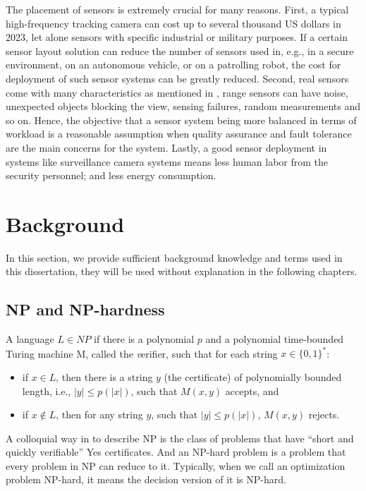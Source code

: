 The placement of sensors is extremely crucial for many reasons.
First, a typical high-frequency tracking camera can cost up to several thousand US dollars in 2023, 
let alone sensors with specific industrial or military purposes. If a certain sensor layout solution
can reduce the number of sensors used in, e.g., in a secure environment, on an autonomous vehicle, or on a patrolling robot,
the cost for deployment of such sensor systems can be greatly reduced.
Second, real sensors come with many characteristics as mentioned in \cite{sebastian2005prob},
range sensors can have noise, unexpected objects blocking the view, sensing failures, random measurements and so on.
Hence, the objective that a sensor system being more balanced in terms of workload is a reasonable assumption
when quality assurance and fault tolerance are the main concerns for the system. 
Lastly, a good sensor deployment in systems like surveillance camera systems means less human labor from the security personnel;
and less energy consumption.
\section{Background}
In this section, we provide sufficient background knowledge and terms used in this dissertation, 
they will be used without explanation in the following chapters. 

\subsection{NP and NP-hardness}
\begin{definition}
    A language $L\in NP$ if there is a polynomial $p$ and a polynomial time-bounded Turing machine M, 
    called the {\textit verifier}, such that for each string $x\in \{0, 1\}^*$: 
    \begin{itemize}
        \item if $x\in L$, then there is a string $y$ (the certificate) of polynomially bounded length, i.e., $|y| \leq p(|x|)$,
        such that $M(x, y)$ accepts, and 
        \item if $x\notin L$, then for any string $y$, such that $|y|\leq p(|x|)$, $M(x,y)$ rejects.
    \end{itemize}
\end{definition}

A colloquial way in \cite{vazirani2001approximation} to describe NP is the class of problems that have ``short and quickly verifiable'' 
Yes certificates.
And an NP-hard problem is a problem that every problem in NP can reduce to it.
Typically, when we call an optimization problem NP-hard, it means the decision version of it is NP-hard.
